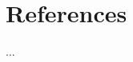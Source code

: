 \documentclass[12pt]{article}
\theoremstyle{definition}
\begin{document}
\newpage
\section{References}
\begin{enumerate}
	 ...
\end{enumerate}

\newpage

%
%
\end{document}

